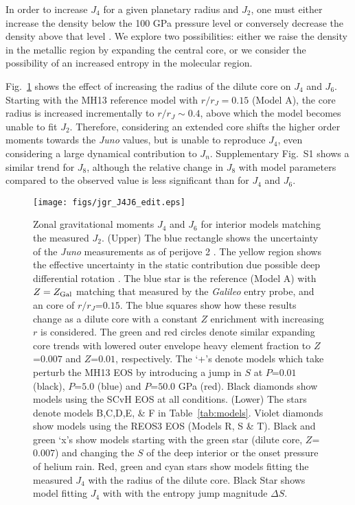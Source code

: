 In order to increase $J_4$ for a given planetary radius and $J_2$,  
one must either increase the density below the 100 GPa pressure level or
conversely decrease the density above that level \citep[][their
Fig.~5]{Guillot1999}. We explore two possibilities: either we raise the density
in the metallic region by expanding the central core, or we consider the
possibility of an increased entropy in the molecular region.

Fig.~\ref{fig:j4j6} shows the effect of increasing the radius of the dilute
core on $J_4$ and $J_6$. Starting with the MH13 reference model with
$r/r_J=0.15$ (Model A), the core radius is increased incrementally to
$r/r_J\sim0.4$, above which the model becomes unable to fit $J_2$.  Therefore,
considering an extended core shifts the higher order moments towards the
\textit{Juno} values, but is unable to reproduce $J_4$, even considering a
large dynamical contribution to $J_n$.  Supplementary Fig.~S1 shows a similar
trend for $J_8$, although the relative change in $J_8$ with model parameters
compared to the observed value is less significant than for $J_4$ and $J_6$. 


\begin{figure}[!h]
\centering

\texttt{[image: figs/jgr\_J4J6\_edit.eps]}

\caption{Zonal gravitational moments $J_4$ and $J_6$ for interior models
    matching the measured $J_2$.
    (Upper) The blue rectangle shows the uncertainty of the \textit{Juno}
    measurements as of perijove 2 \citep{Folkner2017}. The yellow region shows the
    effective uncertainty in the static contribution due possible deep differential
    rotation \citep{Kaspi2017}. The blue star is the reference (Model A) with
    $Z=Z_{\rm Gal}$ matching that measured by the \textit{Galileo} entry probe, and
    an core of $r/r_J$=$0.15$. The blue squares show how these results change as a
    dilute core with a constant $Z$ enrichment with increasing $r$ is considered. The
    green and red circles denote similar expanding core trends with lowered outer
    envelope heavy element fraction to $Z$=$0.007$ and $Z$=$0.01$, respectively.  The
    `+'s denote models which take perturb the MH13 EOS by introducing a jump in $S$
    at $P$=$0.01$ (black), $P$=$5.0$ (blue) and $P$=$50.0$ GPa (red). Black diamonds
    show models using the SCvH EOS at all conditions.     
    (Lower) The stars denote models B,C,D,E, \& F in
    Table~\ref{tab:models}. Violet diamonds show models using the REOS3 EOS
    (Models R, S \& T).  Black and green `x's show models starting with the
    green star (dilute core, $Z$=$0.007$) and changing the $S$ of the deep
    interior or the onset pressure of helium rain. Red, green and cyan stars
show models fitting the measured $J_4$ with the radius of the dilute core.
Black Star shows model fitting $J_4$ with with the entropy jump magnitude
$\Delta S$. 
}
\label{fig:j4j6}
\end{figure}


